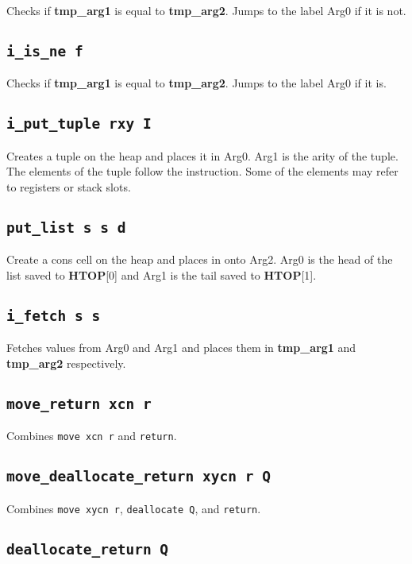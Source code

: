 \documentclass{article}
\newcommand{\tmpa}{\textbf{tmp\_arg1}}
\newcommand{\tmpb}{\textbf{tmp\_arg2}}
\newcommand{\htop}{\textbf{HTOP}}
\newcommand{\iop}[1]{\texttt{#1}}
\begin{document}
Checks if \tmpa{} is equal to \tmpb{}. Jumps to the label Arg0 if it is not.

\subsection*{\iop{i\_is\_ne f}}

Checks if \tmpa{} is equal to \tmpb{}. Jumps to the label Arg0 if it is.

\subsection*{\iop{i\_put\_tuple rxy I}}

Creates a tuple on the heap and places it in Arg0. Arg1 is the arity of the
tuple. The elements of the tuple follow the instruction. Some of the elements
may refer to registers or stack slots.

\subsection*{\iop{put\_list s s d}}

Create a cons cell on the heap and places in onto Arg2. Arg0 is the head of the
list saved to \htop{}[0] and Arg1 is the tail saved to \htop{}[1].

\subsection*{\iop{i\_fetch s s}}

Fetches values from Arg0 and Arg1 and places them in \tmpa{} and \tmpb{}
respectively.

\subsection*{\iop{move\_return xcn r}}

Combines \iop{move xcn r} and \iop{return}.

\subsection*{\iop{move\_deallocate\_return xycn r Q}}

Combines \iop{move xycn r}, \iop{deallocate Q}, and \iop{return}.

\subsection*{\iop{deallocate\_return Q}}
\end{document}
